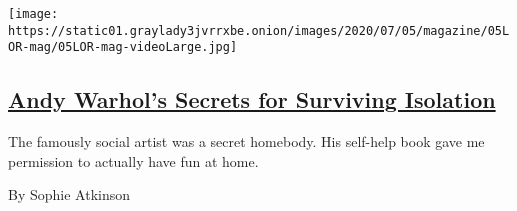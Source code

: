 \begin{enumerate}
  \texttt{[image: https://static01.graylady3jvrrxbe.onion/images/2020/07/05/magazine/05LOR-mag/05LOR-mag-videoLarge.jpg]}

  \hypertarget{andy-warhols-secrets-for-surviving-isolation}{%
  \subsection{\texorpdfstring{\href{/2020/06/30/magazine/the-philosophy-of-andy-warhol.html}{Andy
  Warhol's Secrets for Surviving
  Isolation}}{Andy Warhol's Secrets for Surviving Isolation}}\label{andy-warhols-secrets-for-surviving-isolation}}

  The famously social artist was a secret homebody. His self-help book
  gave me permission to actually have fun at home.

  By Sophie Atkinson
\end{enumerate}

